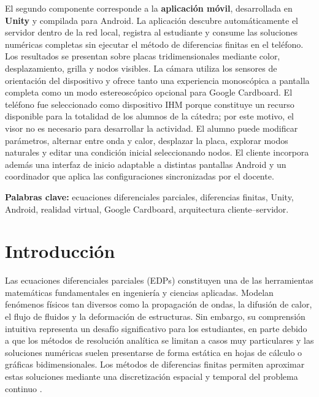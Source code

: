 \documentclass[12pt, a4paper]{article}
\begin{document}
El segundo componente corresponde a la \textbf{aplicación móvil}, desarrollada en
\textbf{Unity} y compilada para Android. La aplicación descubre automáticamente el
servidor dentro de la red local, registra al estudiante y consume las soluciones
numéricas completas sin ejecutar el método de diferencias finitas en el teléfono.
Los resultados se presentan sobre placas tridimensionales mediante color,
desplazamiento, grilla y nodos visibles. La cámara utiliza los sensores de orientación
del dispositivo y ofrece tanto una experiencia monoscópica a pantalla completa como un
modo estereoscópico opcional para Google Cardboard. El teléfono fue seleccionado como
dispositivo IHM porque constituye un recurso disponible para la totalidad de los alumnos
de la cátedra; por este motivo, el visor no es necesario para desarrollar la actividad.
El alumno puede modificar parámetros,
alternar entre onda y calor, desplazar la placa, explorar modos naturales y editar una
condición inicial seleccionando nodos. El cliente incorpora además una interfaz de
inicio adaptable a distintas pantallas Android y un coordinador que aplica las
configuraciones sincronizadas por el docente.

\vspace{0.4cm}
\noindent\textbf{Palabras clave:} ecuaciones diferenciales parciales, diferencias
finitas, Unity, Android, realidad virtual, Google Cardboard, arquitectura
cliente--servidor.

\vfill

\newpage

\section{Introducción}

Las ecuaciones diferenciales parciales (EDPs) constituyen una de las herramientas
matemáticas fundamentales en ingeniería y ciencias aplicadas. Modelan fenómenos
físicos tan diversos como la propagación de ondas, la difusión de calor, el flujo de
fluidos y la deformación de estructuras. Sin embargo, su comprensión intuitiva
representa un desafío significativo para los estudiantes, en parte debido a que los
métodos de resolución analítica se limitan a casos muy particulares y las soluciones
numéricas suelen presentarse de forma estática en hojas de cálculo o gráficas
bidimensionales. Los métodos de diferencias finitas permiten aproximar estas soluciones
mediante una discretización espacial y temporal del problema continuo
\cite{leveque2007}.
\end{document}
